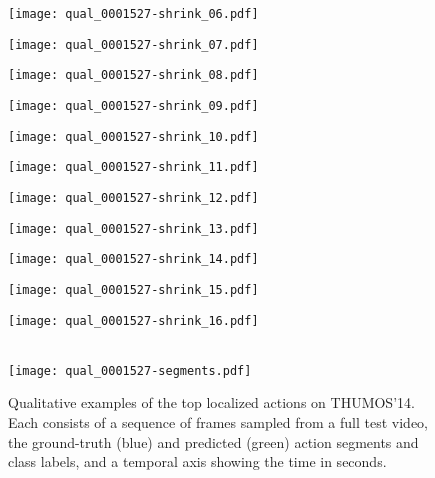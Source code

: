 \documentclass[10pt,twocolumn,letterpaper]{article}
\begin{document}
\begin{figure*}[t]
 \begin{minipage}{0.058\textwidth} \centering \texttt{[image: qual\_0001527-shrink\_06.pdf]} \end{minipage}
 \begin{minipage}{0.058\textwidth} \centering \texttt{[image: qual\_0001527-shrink\_07.pdf]} \end{minipage}
 \begin{minipage}{0.058\textwidth} \centering \texttt{[image: qual\_0001527-shrink\_08.pdf]} \end{minipage}
 \begin{minipage}{0.058\textwidth} \centering \texttt{[image: qual\_0001527-shrink\_09.pdf]} \end{minipage}
 \begin{minipage}{0.058\textwidth} \centering \texttt{[image: qual\_0001527-shrink\_10.pdf]} \end{minipage}
 \begin{minipage}{0.058\textwidth} \centering \texttt{[image: qual\_0001527-shrink\_11.pdf]} \end{minipage}
 \begin{minipage}{0.058\textwidth} \centering \texttt{[image: qual\_0001527-shrink\_12.pdf]} \end{minipage}
 \begin{minipage}{0.058\textwidth} \centering \texttt{[image: qual\_0001527-shrink\_13.pdf]} \end{minipage}
 \begin{minipage}{0.058\textwidth} \centering \texttt{[image: qual\_0001527-shrink\_14.pdf]} \end{minipage}
 \begin{minipage}{0.058\textwidth} \centering \texttt{[image: qual\_0001527-shrink\_15.pdf]} \end{minipage}
 \begin{minipage}{0.058\textwidth} \centering \texttt{[image: qual\_0001527-shrink\_16.pdf]} \end{minipage}
 \\ \vspace{2mm}
 \texttt{[image: qual\_0001527-segments.pdf]}
\caption{\small Qualitative examples of the top localized actions on
THUMOS'14. Each consists of a sequence of frames sampled from a full test
video, the ground-truth (blue) and predicted (green) action segments and class
labels, and a temporal axis showing the time in seconds.}
\label{fig:qualitative}
\end{figure*}
\end{document}
